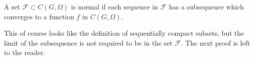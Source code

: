 A set $\mathcal{F} \subset C(G, \Omega)$ is normal if each sequence in $\mathcal{F}$ has a subsequence which converges to a function $f$ in $C(G, \Omega)$.

This of course looks like the definition of sequentially compact subsets, but the limit of the subsequence is not required to be in the set $\mathcal{F}$. The next proof is left to the reader.